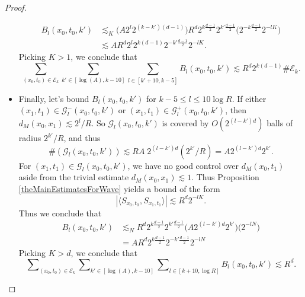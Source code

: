 \begin{proof}
\begin{itemize}
\begin{equation}
    \begin{split}
        B_l(x_0,t_0,k') &\lesssim_K \Big( A 2^{l} 2^{(k-k')(d-1)} \Big)  R^{d} 2^{k \frac{d-1}{2}} 2^{k' \frac{d-1}{2}} \Big( 2^{-k \frac{d-1}{2}} 2^{-lK} \Big)\\
        &\lesssim A R^d 2^l 2^{k(d-1)} 2^{-k' \frac{d-1}{2}} 2^{-lK}.
    \end{split}
    \end{equation}
    Picking $K > 1$, we conclude that
    \begin{equation} \label{AAAlBoundSmall}
        \sum_{(x_0,t_0) \in \mathcal{E}_k} \sum_{k' \in [\log(A), k - 10]} \sum_{l \in [k' + 10, k - 5]} B_l(x_0,t_0,k') \lesssim R^{d} 2^{k (d-1)} \# \mathcal{E}_k.
    \end{equation}

    \item Finally, let's bound $B_l(x_0,t_0,k')$ for $k - 5 \leq l \leq 10 \log R$. If either $(x_1,t_1) \in \mathcal{G}_l^-(x_0,t_0,k')$ or $(x_1,t_1) \in \mathcal{G}_l^+(x_0,t_0,k')$, then $d_M(x_0,x_1) \lesssim 2^l / R$. So $\mathcal{G}_l(x_0,t_0,k')$ is covered by $O( 2^{(l-k')d} )$ balls of radius $2^{k'} / R$, and thus
    \begin{equation}
        \#(\mathcal{G}_l(x_0,t_0,k')) \lesssim R A\; 2^{(l-k')d} (2^{k'} / R) = A 2^{(l-k')d} 2^{k'}.
    \end{equation}
    For $(x_1,t_1) \in \mathcal{G}_l(x_0,t_0,k')$, we have no good control over $d_M(x_0,t_1)$ aside from the trivial estimate $d_M(x_0,x_1) \lesssim 1$. Thus Proposition \ref{theMainEstimatesForWave} yields a bound of the form
    \begin{equation}
        |\langle {S\!}_{x_0,t_0}, {S\!}_{x_1,t_1} \rangle| \lesssim R^d 2^{-lK}.
    \end{equation}
    Thus we conclude that
    \begin{equation}
    \begin{split}
        B_l(x_0,t_0,k') &\lesssim_N R^{d} 2^{k \frac{d-1}{2}} 2^{k' \frac{d-1}{2}} \Big( A 2^{(l-k')d} 2^{k'} \Big) \Big( 2^{-lN} \Big)\\
        &= A R^d 2^{k \frac{d-1}{2}} 2^{-k' \frac{d-1}{2}} 2^{-lN}
    \end{split}
    \end{equation}
    Picking $K > d$, we conclude that
    \begin{equation} \label{AAAlBoundBig}
        \sum\nolimits_{(x_0,t_0) \in \mathcal{E}_k} \sum\nolimits_{k' \in [\log(A), k - 10]} \sum\nolimits_{l \in [k+10,\log R]} B_l(x_0,t_0,k')  \lesssim R^d.

\end{equation}
\end{itemize}
\end{proof}
